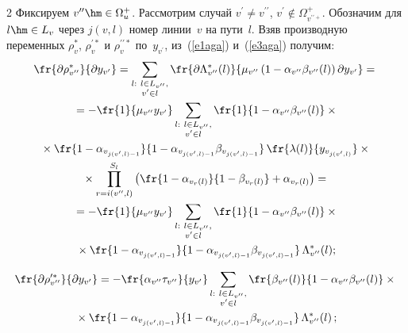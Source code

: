 \begin{multicols}{2}
   Фиксируем $v^{\prime\prime}\hm\in\Omega_u^+$. Рассмотрим случай 
$v^\prime\not= v^{\prime\prime}$, $v^\prime\not\in\Omega^+_{v^{\prime\prime +}}$. 
Обозначим для $l\hm\in L_v$ через $j(v,l)$ номер линии~$v$ на пути~$l$. 
Взяв производную переменных $\rho_v^*$, $\rho_v^{\prime *}$ и
$\rho_v^{\prime\prime *}$ по~$y_{v^\prime}$, из~(\ref{e1aga}) и~(\ref{e3aga}) 
получим: 
   \begin{multline*}
   \fr{\partial \rho^*_{ v^{\prime\prime}}}{\partial 
y_{v^\prime}}=\sum\limits_{\substack{{l:\ l\in L_{ v^{\prime\prime}},}\\ {v^\prime\in l}}} 
\fr{\partial \Lambda^*_{ v^{\prime\prime}}(l)}
   {\mu_{ v^{\prime\prime}}\left(1-\alpha_{ v^{\prime\prime}}\beta_{ 
v^{\prime\prime}}(l)\right)\partial y_{v^\prime}}={}\\
   {}=
   -\fr{1}{\mu_{ v^{\prime\prime}} y_{v^\prime}} 
   \sum\limits_{\substack{{l:\ l\in L_{ v^{\prime\prime}},}\\ {v^\prime\in l}}} 
   \fr{1}{1-\alpha_{ v^{\prime\prime}} \beta_{v^{\prime\prime}}(l)}\times{}\\
{}\times\fr{1-\alpha_{v_{j(v^\prime,l)-1}}}{1-
\alpha_{v_{j(v^\prime,l)-1}}\beta_{ v_{j(v^\prime,l)-1}}}\, 
\fr{\lambda(l)}{y_{ 
v_{j(v^\prime,l)}}} \times{}\\
{}\times
\prod\limits_{r=i(v^{\prime\prime},l)}^{S_l}\left(
   \fr{1-\alpha_{v_r(l)}}{1-\beta_{v_r(l)}}+\alpha_{v_r(l)}\right)={}\\
   {}=
    -\fr{1}{\mu_{v^{\prime\prime}}y_{v^\prime}}
\sum\limits_{\substack{{l:\ l\in L_{ v^{\prime\prime}},}\\ {v^\prime\in l}}}
      \fr{1}{1-\alpha_{ v^{\prime\prime}}\beta_{ v^{\prime\prime}}(l)}\times{}\\
      {}\times
      \fr{1-\alpha_{ v_{j(v^\prime,l)-1}}}{1-\alpha_{ v_{j(v^\prime,l)-
1}}\beta_{v_{j(v^\prime,l)-1}}}\, \Lambda^*_{ v^{\prime\prime}}(l);
      \end{multline*}
      
      \vspace*{-9pt}
      
      \noindent
  \begin{multline*}
      \fr{\partial \rho_{v^{\prime\prime}}^{\prime *} }
      {\partial y_{v^\prime}} =-\fr{\alpha_{v^{\prime\prime}}\tau_{v^{\prime\prime}}}{y_{v^\prime}}
      \sum\limits_{\substack{{l:\ l\in L_{ v^{\prime\prime}},}\\ {v^\prime\in l}}}  
      \fr{\beta_{ v^{\prime\prime}}(l)}{1-\alpha_{ v^{\prime\prime}}\beta_{ 
v^{\prime\prime}}(l)}\times{}\\
{}\times
      \fr{1-\alpha_{ v_{j(v^\prime,l)-1}}}{1-\alpha_{ v_{j(v^\prime,l)-
1}}\beta_{v_{j(v^\prime,l)-1}}}\, \Lambda^*_{ v^{\prime\prime}}(l)\,;
     \end{multline*}
     

\end{multicols}
